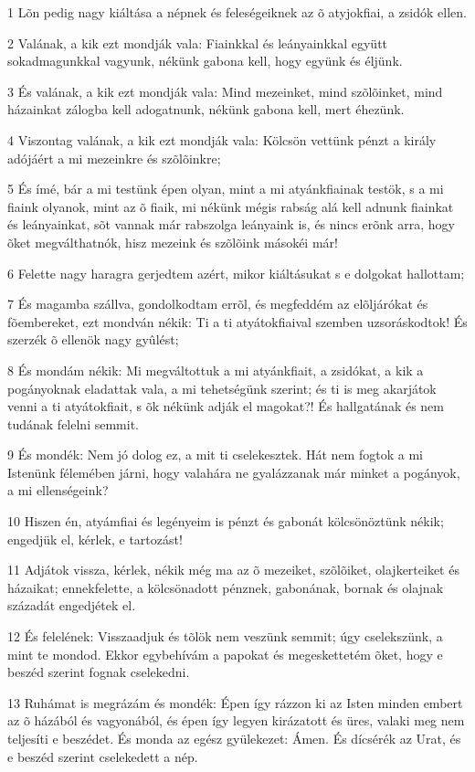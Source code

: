 \par 1 Lõn pedig nagy kiáltása a népnek és feleségeiknek az õ atyjokfiai, a zsidók ellen.
\par 2 Valának, a kik ezt mondják vala: Fiainkkal és leányainkkal együtt sokadmagunkkal vagyunk, nékünk gabona kell, hogy együnk és éljünk.
\par 3 És valának, a kik ezt mondják vala: Mind mezeinket, mind szõlõinket, mind házainkat zálogba kell adogatnunk, nékünk gabona kell, mert éhezünk.
\par 4 Viszontag valának, a kik ezt mondják vala: Kölcsön vettünk pénzt a király adójáért a mi mezeinkre és szõlõinkre;
\par 5 És ímé, bár a mi testünk épen olyan, mint a mi atyánkfiainak testök, s a mi fiaink olyanok, mint az õ fiaik, mi nékünk mégis rabság alá kell adnunk fiainkat és leányainkat, sõt vannak már rabszolga leányaink is, és nincs erõnk arra, hogy õket megválthatnók, hisz mezeink és szõlõink másokéi már!
\par 6 Felette nagy haragra gerjedtem azért, mikor kiáltásukat s e dolgokat hallottam;
\par 7 És magamba szállva, gondolkodtam errõl, és megfeddém az elõljárókat és fõembereket, ezt mondván nékik: Ti a ti atyátokfiaival szemben uzsoráskodtok! És szerzék õ ellenök nagy gyûlést;
\par 8 És mondám nékik: Mi megváltottuk a mi atyánkfiait, a zsidókat, a kik a pogányoknak eladattak vala, a mi tehetségünk szerint; és ti is meg akarjátok venni a ti atyátokfiait, s õk nékünk adják el magokat?! És hallgatának és nem tudának felelni semmit.
\par 9 És mondék: Nem jó dolog ez, a mit ti cselekesztek. Hát nem fogtok a mi Istenünk félemében járni, hogy valahára ne gyalázzanak már minket a pogányok, a mi ellenségeink?
\par 10 Hiszen én, atyámfiai és legényeim is pénzt és gabonát kölcsönöztünk nékik; engedjük el, kérlek, e tartozást!
\par 11 Adjátok vissza, kérlek, nékik még ma az õ mezeiket, szõlõiket, olajkerteiket és házaikat; ennekfelette, a kölcsönadott pénznek, gabonának, bornak és olajnak századát engedjétek el.
\par 12 És felelének: Visszaadjuk és tõlök nem veszünk semmit; úgy cselekszünk, a mint te mondod. Ekkor egybehívám a papokat és megeskettetém õket, hogy e beszéd szerint fognak cselekedni.
\par 13 Ruhámat is megrázám és mondék: Épen így rázzon ki az Isten minden embert az õ házából és vagyonából, és épen így legyen kirázatott és üres, valaki meg nem teljesíti e beszédet. És monda az egész gyülekezet: Ámen. És dícsérék az Urat, és e beszéd szerint cselekedett a nép.
